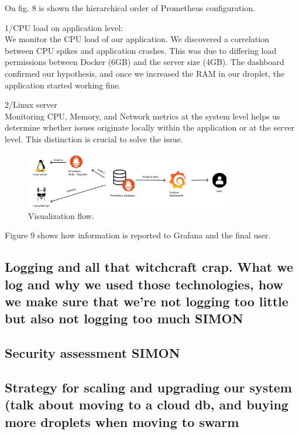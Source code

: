 \documentclass{article}
\begin{document}
On fig. 8 is shown the hierarchical order of Prometheus configuration. 

1/CPU load on application level:
\\We monitor the CPU load of our application. We discovered a correlation between CPU spikes and application crashes. This was due to differing load permissions between Docker (6GB) and the server size (4GB). The dashboard confirmed our hypothesis, and once we increased the RAM in our droplet, the application started working fine.

2/Linux server 
\\Monitoring CPU, Memory, and Network metrics at the system level helps us determine whether issues originate locally within the application or at the server level. This distinction is crucial to solve the issue.

\begin{figure}[ht]
    \centering
    \includegraphics[width=0.8\textwidth]{./pdfs/visualization_flow.pdf} 
    \caption{Visualization flow.}
    \label{fig:visualization flow}
\end{figure}

Figure 9 shows how information is reported to Grafana and the final user.

\subsection{Logging and all that witchcraft crap. What we log and why we used those technologies, how we make sure that we're not logging too little but also not logging too much SIMON}

\subsection{Security assessment SIMON}

\subsection{Strategy for scaling and upgrading our system (talk about moving to a cloud db, and buying more droplets when moving to swarm}
\end{document}
